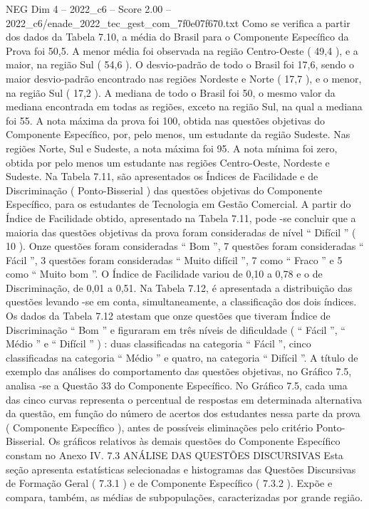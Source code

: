 \begin{textsample}{NEG Dim 4 – 2022\_c6 – Score 2.00 – 2022\_c6/enade\_2022\_tec\_gest\_com\_7f0e07f670.txt}
Como se verifica a partir dos dados da Tabela 7.10, a média do Brasil para o Componente Específico da Prova foi 50,5.
A menor média foi observada na região Centro-Oeste ( 49,4 ), e a maior, na região Sul ( 54,6 ).
O desvio-padrão de todo o Brasil foi 17,6, sendo o maior desvio-padrão encontrado nas regiões Nordeste e Norte ( 17,7 ), e o menor, na região Sul ( 17,2 ).
A mediana de todo o Brasil foi 50, o mesmo valor da mediana encontrada em todas as regiões, exceto na região Sul, na qual a mediana foi 55.
A nota máxima da prova foi 100, obtida nas questões objetivas do Componente Específico, por, pelo menos, um estudante da região Sudeste.
Nas regiões Norte, Sul e Sudeste, a nota máxima foi 95.
A nota mínima foi zero, obtida por pelo menos um estudante nas regiões Centro-Oeste, Nordeste e Sudeste.
Na Tabela 7.11, são apresentados os Índices de Facilidade e de Discriminação ( Ponto-Bisserial ) das questões objetivas do Componente Específico, para os estudantes de Tecnologia em Gestão Comercial.
A partir do Índice de Facilidade obtido, apresentado na Tabela 7.11, pode -se concluir que a maioria das questões objetivas da prova foram consideradas de nível “ Difícil ” ( 10 ).
Onze questões foram consideradas “ Bom ”, 7 questões foram consideradas “ Fácil ”, 3 questões foram consideradas “ Muito difícil ”, 7 como “ Fraco ” e 5 como “ Muito bom ”.
O Índice de Facilidade variou de 0,10 a 0,78 e o de Discriminação, de 0,01 a 0,51.
Na Tabela 7.12, é apresentada a distribuição das questões levando -se em conta, simultaneamente, a classificação dos dois índices.
Os dados da Tabela 7.12 atestam que onze questões que tiveram Índice de Discriminação “ Bom ” e figuraram em três níveis de dificuldade ( “ Fácil ”, “ Médio ” e “ Difícil ” ) : duas classificadas na categoria “ Fácil ”, cinco classificadas na categoria “ Médio ” e quatro, na categoria “ Difícil ”.
A título de exemplo das análises do comportamento das questões objetivas, no Gráfico 7.5, analisa -se a Questão 33 do Componente Específico.
No Gráfico 7.5, cada uma das cinco curvas representa o percentual de respostas em determinada alternativa da questão, em função do número de acertos dos estudantes nessa parte da prova ( Componente Específico ), antes de possíveis eliminações pelo critério Ponto-Bisserial.
Os gráficos relativos às demais questões do Componente Específico constam no Anexo IV. 7.3 ANÁLISE DAS QUESTÕES DISCURSIVAS Esta seção apresenta estatísticas selecionadas e histogramas das Questões Discursivas de Formação Geral ( 7.3.1 ) e de Componente Específico ( 7.3.2 ).
Expõe e compara, também, as médias de subpopulações, caracterizadas por grande região.

\end{textsample}
